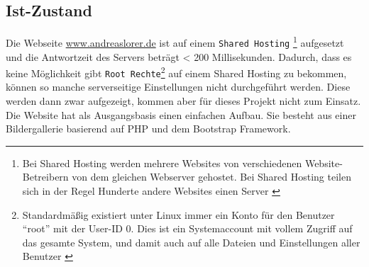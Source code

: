 	\subsection{Ist-Zustand} %
	\label{sub:ist_zustand}
		Die Webseite \url{www.andreaslorer.de}  ist auf einem \texttt{Shared Hosting}
		\footnote{Bei Shared Hosting werden mehrere Websites von verschiedenen Website-Betreibern von dem gleichen Webserver gehostet. Bei Shared Hosting teilen sich in der Regel Hunderte andere Websites einen Server \autocite{itWissen}} 
		aufgesetzt und die Antwortzeit des Servers beträgt < 200 Millisekunden. Dadurch, dass es keine Möglichkeit gibt \texttt{Root Rechte}\footnote{Standardmäßig existiert unter Linux immer ein Konto für den Benutzer "`root"' mit der User-ID 0. Dies ist ein Systemaccount mit vollem Zugriff auf das gesamte System, und damit auch auf alle Dateien und Einstellungen aller Benutzer \autocite{ubuntu14}} auf einem Shared Hosting zu bekommen, können so manche serverseitige Einstellungen nicht durchgeführt werden. Diese werden dann zwar aufgezeigt, kommen aber für dieses Projekt nicht zum Einsatz.\\
		Die Website hat als Ausgangsbasis einen einfachen Aufbau. Sie besteht aus einer Bildergallerie basierend auf PHP und dem Bootstrap Framework.



\pagebreak
%
%

